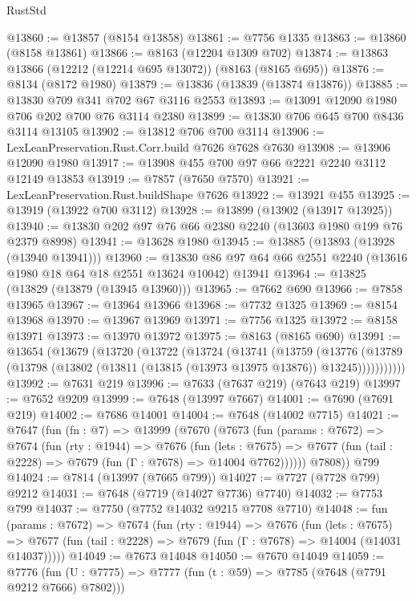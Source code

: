 \begin{lexlean}{RustStd}
\begin{coremodule}
{\begin{coremodule}
{{{{{{{{{{{{{{{{{{{{{{{{{{{{{{{{{{{{{{{{{{{{{{{{{{{{{@13860 := @13857 (@8154 @13858)
@13861 := @7756 @1335
@13863 := @13860 (@8158 @13861)
@13866 := @8163 (@12204 @1309 @702)
@13874 := @13863 @13866 (@12212 (@12214 @695 @13072)) (@8163 (@8165 @695))
@13876 := @8134 (@8172 @1980)
@13879 := @13836 (@13839 (@13874 @13876))
@13885 := @13830 @709 @341 @702 @67 @3116 @2553
@13893 := @13091 @12090 @1980 @706 @202 @700 @76 @3114 @2380
@13899 := @13830 @706 @645 @700 @8436 @3114 @13105
@13902 := @13812 @706 @700 @3114
@13906 := LexLeanPreservation.Rust.Corr.build @7626 @7628 @7630
@13908 := @13906 @12090 @1980
@13917 := @13908 @455 @700 @97 @66 @2221 @2240 @3112 @12149 @13853
@13919 := @7857 (@7650 @7570)
@13921 := LexLeanPreservation.Rust.buildShape @7626
@13922 := @13921 @455
@13925 := @13919 (@13922 @700 @3112)
@13928 := @13899 (@13902 (@13917 @13925))
@13940 := @13830 @202 @97 @76 @66 @2380 @2240 (@13603 @1980 @199 @76 @2379 @8998)
@13941 := @13628 @1980
@13945 := @13885 (@13893 (@13928 (@13940 @13941)))
@13960 := @13830 @86 @97 @64 @66 @2551 @2240 (@13616 @1980 @18 @64 @18 @2551 @13624 @10042) @13941
@13964 := @13825 (@13829 (@13879 (@13945 @13960)))
@13965 := @7662 @690
@13966 := @7858 @13965
@13967 := @13964 @13966
@13968 := @7732 @1325
@13969 := @8154 @13968
@13970 := @13967 @13969
@13971 := @7756 @1325
@13972 := @8158 @13971
@13973 := @13970 @13972
@13975 := @8163 (@8165 @690)
@13991 := @13654
    (@13679
      (@13720
        (@13722
          (@13724
            (@13741
              (@13759
                (@13776
                  (@13789 (@13798 (@13802 (@13811 (@13815 (@13973 @13975 @13876)) @13245)))))))))))
@13992 := @7631 @219
@13996 := @7633 (@7637 @219) (@7643 @219)
@13997 := @7652 @9209
@13999 := @7648 (@13997 @7667)
@14001 := @7690 (@7691 @219)
@14002 := @7686 @14001
@14004 := @7648 (@14002 @7715)
@14021 := @7647
    (fun (fn : @7) =>
    @13999
      (@7670
        (@7673
          (fun (params : @7672) =>
          @7674
            (fun (rty : @1944) =>
            @7676
              (fun (lets : @7675) =>
              @7677 (fun (tail : @2228) => @7679 (fun (Γ : @7678) => @14004 @7762))))))
        @7808))
    @799
@14024 := @7814 (@13997 (@7665 @799))
@14027 := @7727 (@7728 @799) @9212
@14031 := @7648 (@7719 (@14027 @7736) @7740)
@14032 := @7753 @799
@14037 := @7750 (@7752 @14032 @9215 @7708 @7710)
@14048 := fun (params : @7672) =>
  @7674
    (fun (rty : @1944) =>
    @7676
      (fun (lets : @7675) =>
      @7677 (fun (tail : @2228) => @7679 (fun (Γ : @7678) => @14004 (@14031 @14037)))))
@14049 := @7673 @14048
@14050 := @7670 @14049
@14059 := @7776
    (fun (U : @7775) => @7777 (fun (t : @59) => @7785 (@7648 (@7791 @9212 @7666) @7802)))
}}}}}}}}}}}}}}}}}}}}}}}}}}}}}}}}}}}}}}}}}}}}}}}}}}}}}
\end{coremodule}}
\end{coremodule}
\end{lexlean}
